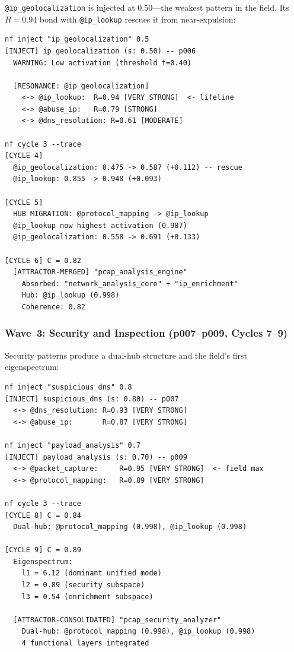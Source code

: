 \texttt{@ip\_geolocalization} is injected at 0.50---the weakest pattern
in the field.  Its $R = 0.94$ bond with \texttt{@ip\_lookup} rescues it
from near-expulsion:

\begin{terminalbox}
\begin{lstlisting}[style=neosshell]
nf inject "ip_geolocalization" 0.5
[INJECT] ip_geolocalization (s: 0.50) -- p006
  WARNING: Low activation (threshold t=0.40)

  [RESONANCE: @ip_geolocalization]
    <-> @ip_lookup:  R=0.94 [VERY STRONG]  <- lifeline
    <-> @abuse_ip:   R=0.79 [STRONG]
    <-> @dns_resolution: R=0.61 [MODERATE]

nf cycle 3 --trace
[CYCLE 4]
  @ip_geolocalization: 0.475 -> 0.587 (+0.112) -- rescue
  @ip_lookup: 0.855 -> 0.948 (+0.093)

[CYCLE 5]
  HUB MIGRATION: @protocol_mapping -> @ip_lookup
  @ip_lookup now highest activation (0.987)
  @ip_geolocalization: 0.558 -> 0.691 (+0.133)

[CYCLE 6] C = 0.82
  [ATTRACTOR-MERGED] "pcap_analysis_engine"
    Absorbed: "network_analysis_core" + "ip_enrichment"
    Hub: @ip_lookup (0.998)
    Coherence: 0.82
\end{lstlisting}
\end{terminalbox}

\subsubsection*{Wave~3: Security and Inspection (p007--p009, Cycles 7--9)}

Security patterns produce a dual-hub structure and the field's first
eigenspectrum:

\begin{terminalbox}
\begin{lstlisting}[style=neosshell]
nf inject "suspicious_dns" 0.8
[INJECT] suspicious_dns (s: 0.80) -- p007
  <-> @dns_resolution: R=0.93 [VERY STRONG]
  <-> @abuse_ip:       R=0.87 [VERY STRONG]

nf inject "payload_analysis" 0.7
[INJECT] payload_analysis (s: 0.70) -- p009
  <-> @packet_capture:     R=0.95 [VERY STRONG]  <- field max
  <-> @protocol_mapping:   R=0.89 [VERY STRONG]

nf cycle 3 --trace
[CYCLE 8] C = 0.84
  Dual-hub: @protocol_mapping (0.998), @ip_lookup (0.998)

[CYCLE 9] C = 0.89
  Eigenspectrum:
    l1 = 6.12 (dominant unified mode)
    l2 = 0.89 (security subspace)
    l3 = 0.54 (enrichment subspace)

  [ATTRACTOR-CONSOLIDATED] "pcap_security_analyzer"
    Dual-hub: @protocol_mapping (0.998), @ip_lookup (0.998)
    4 functional layers integrated
\end{lstlisting}
\end{terminalbox}

